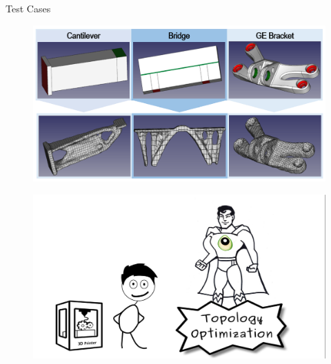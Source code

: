 \begin{frame}{Test Cases}
\begin{figure}
		\includegraphics[width=1\linewidth]{Pictures/SecondHalf/TestCases.png}
		\end{figure}

\end{frame}
\begin{frame}
\begin{figure}

\vspace{-.7cm}	
\hspace{-2cm}		\includegraphics[width=1.2\linewidth]{Pictures/animations/animation_10.png}
		\end{figure}

\end{frame}

